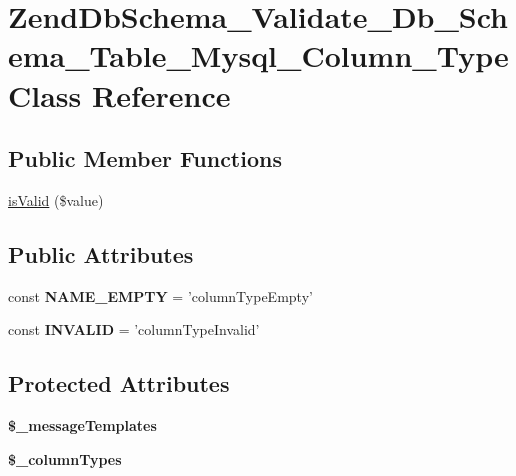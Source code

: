 \hypertarget{classZendDbSchema__Validate__Db__Schema__Table__Mysql__Column__Type}{\section{\-Zend\-Db\-Schema\-\_\-\-Validate\-\_\-\-Db\-\_\-\-Schema\-\_\-\-Table\-\_\-\-Mysql\-\_\-\-Column\-\_\-\-Type \-Class \-Reference}
\label{classZendDbSchema__Validate__Db__Schema__Table__Mysql__Column__Type}
}
\subsection*{\-Public \-Member \-Functions}
\begin{DoxyCompactItemize}
\item 
\hyperlink{classZendDbSchema__Validate__Db__Schema__Table__Mysql__Column__Type_a9d09e82df24eda87790229013c3b9caf}{is\-Valid} (\$value)
\end{DoxyCompactItemize}
\subsection*{\-Public \-Attributes}
\begin{DoxyCompactItemize}
\item 
\hypertarget{classZendDbSchema__Validate__Db__Schema__Table__Mysql__Column__Type_acb3def942f8527314e1521634910c336}{const {\bfseries \-N\-A\-M\-E\-\_\-\-E\-M\-P\-T\-Y} = 'column\-Type\-Empty'}\label{classZendDbSchema__Validate__Db__Schema__Table__Mysql__Column__Type_acb3def942f8527314e1521634910c336}

\item 
\hypertarget{classZendDbSchema__Validate__Db__Schema__Table__Mysql__Column__Type_a82bf0a3892455674c8eed1c290a80c53}{const {\bfseries \-I\-N\-V\-A\-L\-I\-D} = 'column\-Type\-Invalid'}\label{classZendDbSchema__Validate__Db__Schema__Table__Mysql__Column__Type_a82bf0a3892455674c8eed1c290a80c53}

\end{DoxyCompactItemize}
\subsection*{\-Protected \-Attributes}
\begin{DoxyCompactItemize}
\item 
{\bfseries \$\-\_\-message\-Templates}
\item 
\hypertarget{classZendDbSchema__Validate__Db__Schema__Table__Mysql__Column__Type_a14bd5cf7b7e100d3a209ab65c707b2f6}{{\bfseries \$\-\_\-column\-Types}}\label{classZendDbSchema__Validate__Db__Schema__Table__Mysql__Column__Type_a14bd5cf7b7e100d3a209ab65c707b2f6}

\end{DoxyCompactItemize}


